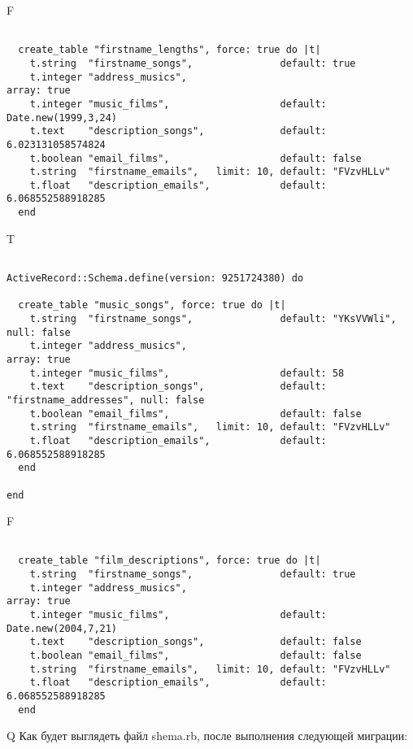 F
\begin{verbatim}

  create_table "firstname_lengths", force: true do |t|
    t.string  "firstname_songs",               default: true
    t.integer "address_musics",                                                             array: true
    t.integer "music_films",                   default: Date.new(1999,3,24)
    t.text    "description_songs",             default: 6.023131058574824
    t.boolean "email_films",                   default: false
    t.string  "firstname_emails",   limit: 10, default: "FVzvHLLv"
    t.float   "description_emails",            default: 6.068552588918285
  end

\end{verbatim}

T
\begin{verbatim}

ActiveRecord::Schema.define(version: 9251724380) do

  create_table "music_songs", force: true do |t|
    t.string  "firstname_songs",               default: "YKsVVWli",            null: false
    t.integer "address_musics",                                                             array: true
    t.integer "music_films",                   default: 58
    t.text    "description_songs",             default: "firstname_addresses", null: false
    t.boolean "email_films",                   default: false
    t.string  "firstname_emails",   limit: 10, default: "FVzvHLLv"
    t.float   "description_emails",            default: 6.068552588918285
  end

end
\end{verbatim}


F
\begin{verbatim}

  create_table "film_descriptions", force: true do |t|
    t.string  "firstname_songs",               default: true
    t.integer "address_musics",                                                             array: true
    t.integer "music_films",                   default: Date.new(2004,7,21)
    t.text    "description_songs",             default: false
    t.boolean "email_films",                   default: false
    t.string  "firstname_emails",   limit: 10, default: "FVzvHLLv"
    t.float   "description_emails",            default: 6.068552588918285
  end

\end{verbatim}

Q
Как будет выглядеть файл shema.rb, после выполнения следующей миграции:

